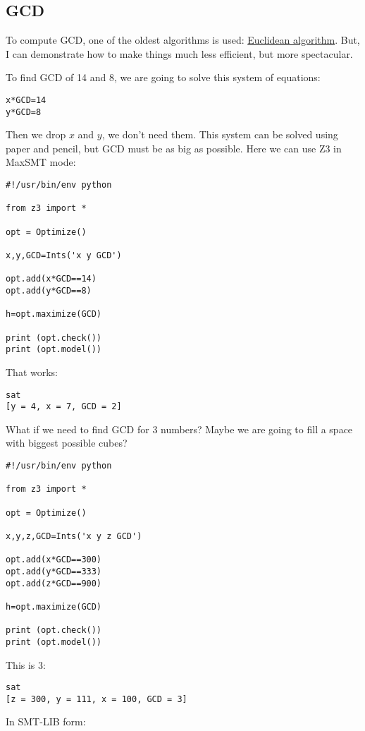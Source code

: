 \subsection{\ac{GCD}}
\label{GCD}

To compute GCD, one of the oldest algorithms is used: \href{https://en.wikipedia.org/wiki/Euclidean_algorithm}{Euclidean algorithm}.
But, I can demonstrate how to make things much less efficient, but more spectacular.

To find GCD of 14 and 8, we are going to solve this system of equations:

\begin{lstlisting}
x*GCD=14
y*GCD=8
\end{lstlisting}

Then we drop $x$ and $y$, we don't need them.
This system can be solved using paper and pencil, but GCD must be as big as possible.
Here we can use Z3 in MaxSMT mode:

\begin{lstlisting}
#!/usr/bin/env python

from z3 import *

opt = Optimize()

x,y,GCD=Ints('x y GCD')

opt.add(x*GCD==14)
opt.add(y*GCD==8)

h=opt.maximize(GCD)

print (opt.check())
print (opt.model())
\end{lstlisting}

That works:

\begin{lstlisting}
sat
[y = 4, x = 7, GCD = 2]
\end{lstlisting}

What if we need to find GCD for 3 numbers?
Maybe we are going to fill a space with biggest possible cubes?

\begin{lstlisting}
#!/usr/bin/env python

from z3 import *

opt = Optimize()

x,y,z,GCD=Ints('x y z GCD')

opt.add(x*GCD==300)
opt.add(y*GCD==333)
opt.add(z*GCD==900)

h=opt.maximize(GCD)

print (opt.check())
print (opt.model())
\end{lstlisting}

This is 3:

\begin{lstlisting}
sat
[z = 300, y = 111, x = 100, GCD = 3]
\end{lstlisting}

In SMT-LIB form:



